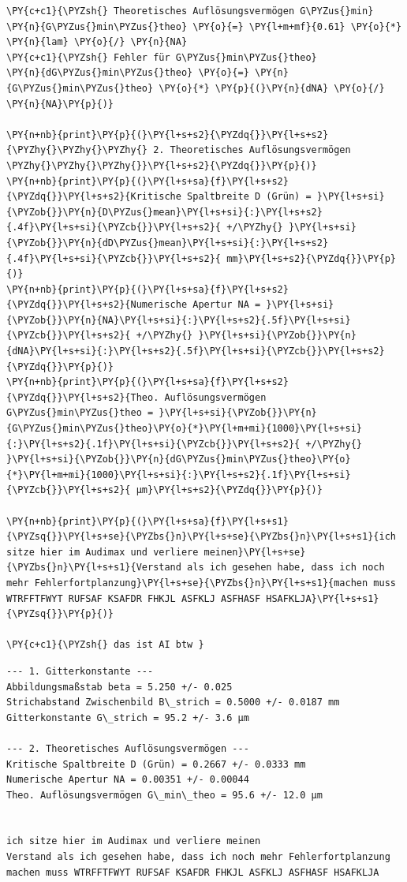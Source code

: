 \begin{tcolorbox}[breakable, size=fbox, boxrule=1pt, pad at break*=1mm,colback=cellbackground, colframe=cellborder]
\begin{Verbatim}[commandchars=\\\{\}]
\PY{c+c1}{\PYZsh{} Theoretisches Auflösungsvermögen G\PYZus{}min}
\PY{n}{G\PYZus{}min\PYZus{}theo} \PY{o}{=} \PY{l+m+mf}{0.61} \PY{o}{*} \PY{n}{lam} \PY{o}{/} \PY{n}{NA}
\PY{c+c1}{\PYZsh{} Fehler für G\PYZus{}min\PYZus{}theo}
\PY{n}{dG\PYZus{}min\PYZus{}theo} \PY{o}{=} \PY{n}{G\PYZus{}min\PYZus{}theo} \PY{o}{*} \PY{p}{(}\PY{n}{dNA} \PY{o}{/} \PY{n}{NA}\PY{p}{)}

\PY{n+nb}{print}\PY{p}{(}\PY{l+s+s2}{\PYZdq{}}\PY{l+s+s2}{\PYZhy{}\PYZhy{}\PYZhy{} 2. Theoretisches Auflösungsvermögen \PYZhy{}\PYZhy{}\PYZhy{}}\PY{l+s+s2}{\PYZdq{}}\PY{p}{)}
\PY{n+nb}{print}\PY{p}{(}\PY{l+s+sa}{f}\PY{l+s+s2}{\PYZdq{}}\PY{l+s+s2}{Kritische Spaltbreite D (Grün) = }\PY{l+s+si}{\PYZob{}}\PY{n}{D\PYZus{}mean}\PY{l+s+si}{:}\PY{l+s+s2}{.4f}\PY{l+s+si}{\PYZcb{}}\PY{l+s+s2}{ +/\PYZhy{} }\PY{l+s+si}{\PYZob{}}\PY{n}{dD\PYZus{}mean}\PY{l+s+si}{:}\PY{l+s+s2}{.4f}\PY{l+s+si}{\PYZcb{}}\PY{l+s+s2}{ mm}\PY{l+s+s2}{\PYZdq{}}\PY{p}{)}
\PY{n+nb}{print}\PY{p}{(}\PY{l+s+sa}{f}\PY{l+s+s2}{\PYZdq{}}\PY{l+s+s2}{Numerische Apertur NA = }\PY{l+s+si}{\PYZob{}}\PY{n}{NA}\PY{l+s+si}{:}\PY{l+s+s2}{.5f}\PY{l+s+si}{\PYZcb{}}\PY{l+s+s2}{ +/\PYZhy{} }\PY{l+s+si}{\PYZob{}}\PY{n}{dNA}\PY{l+s+si}{:}\PY{l+s+s2}{.5f}\PY{l+s+si}{\PYZcb{}}\PY{l+s+s2}{\PYZdq{}}\PY{p}{)}
\PY{n+nb}{print}\PY{p}{(}\PY{l+s+sa}{f}\PY{l+s+s2}{\PYZdq{}}\PY{l+s+s2}{Theo. Auflösungsvermögen G\PYZus{}min\PYZus{}theo = }\PY{l+s+si}{\PYZob{}}\PY{n}{G\PYZus{}min\PYZus{}theo}\PY{o}{*}\PY{l+m+mi}{1000}\PY{l+s+si}{:}\PY{l+s+s2}{.1f}\PY{l+s+si}{\PYZcb{}}\PY{l+s+s2}{ +/\PYZhy{} }\PY{l+s+si}{\PYZob{}}\PY{n}{dG\PYZus{}min\PYZus{}theo}\PY{o}{*}\PY{l+m+mi}{1000}\PY{l+s+si}{:}\PY{l+s+s2}{.1f}\PY{l+s+si}{\PYZcb{}}\PY{l+s+s2}{ µm}\PY{l+s+s2}{\PYZdq{}}\PY{p}{)}

\PY{n+nb}{print}\PY{p}{(}\PY{l+s+sa}{f}\PY{l+s+s1}{\PYZsq{}}\PY{l+s+se}{\PYZbs{}n}\PY{l+s+se}{\PYZbs{}n}\PY{l+s+s1}{ich sitze hier im Audimax und verliere meinen}\PY{l+s+se}{\PYZbs{}n}\PY{l+s+s1}{Verstand als ich gesehen habe, dass ich noch mehr Fehlerfortplanzung}\PY{l+s+se}{\PYZbs{}n}\PY{l+s+s1}{machen muss WTRFFTFWYT RUFSAF KSAFDR FHKJL ASFKLJ ASFHASF HSAFKLJA}\PY{l+s+s1}{\PYZsq{}}\PY{p}{)}

\PY{c+c1}{\PYZsh{} das ist AI btw }
\end{Verbatim}
\end{tcolorbox}

    \begin{Verbatim}[commandchars=\\\{\}]
--- 1. Gitterkonstante ---
Abbildungsmaßstab beta = 5.250 +/- 0.025
Strichabstand Zwischenbild B\_strich = 0.5000 +/- 0.0187 mm
Gitterkonstante G\_strich = 95.2 +/- 3.6 µm

--- 2. Theoretisches Auflösungsvermögen ---
Kritische Spaltbreite D (Grün) = 0.2667 +/- 0.0333 mm
Numerische Apertur NA = 0.00351 +/- 0.00044
Theo. Auflösungsvermögen G\_min\_theo = 95.6 +/- 12.0 µm


ich sitze hier im Audimax und verliere meinen
Verstand als ich gesehen habe, dass ich noch mehr Fehlerfortplanzung
machen muss WTRFFTFWYT RUFSAF KSAFDR FHKJL ASFKLJ ASFHASF HSAFKLJA
    \end{Verbatim}

